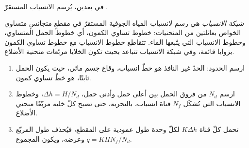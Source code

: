 في بعدين، يُرسم الانسياب المستقرّ .

\begin{definition}\label{def:b3:hydrogeology:flow-net}
\emph{شبكة الانسياب} هي رسم لانسياب المياه الجوفية المستقرّ في
مقطعٍ متجانسٍ متساوي الخواص بعائلتين من المنحنيات: خطوط تساوي الكمون،
أي خطوط الحمل المتساوي، وخطوط الانسياب التي يتّبعها الماء. 
تتقاطع خطوط الانسياب مع خطوط تساوي الكمون بزوايا قائمة، وفي شبكة الانسياب
تتباعد بحيث تكون الخلايا مربّعات منحنية الأضلاع.
\end{definition}

\begin{method}\label{met:b3:hydrogeology:flow-net}
\leavevmode
\begin{enumerate}
\item ارسم الحدود: الحدّ غير النافذ هو خطّ انسياب، وقاع جسم
  مائي، حيث يكون الحمل ثابتًا، هو خطّ تساوي كمون.
\item ارسم $N_d$ من فروق الحمل بين أعلى حمل وأدنى حمل، $\Delta h
  = H/N_d$، وخطوط الانسياب التي تُشكّل $N_f$ قناة انسياب، بالتجربة،
  حتى تصبح كلّ خلية مربّعًا منحني الأضلاع.
\item تحمل كلّ قناة $K\Delta h$ لكلّ وحدة طول عمودية على
  المقطع، فيُحذف طول المربّع وعرضه، ويكون المجموع $q =
  KHN_f/N_d$.
\end{enumerate}
\end{method}


